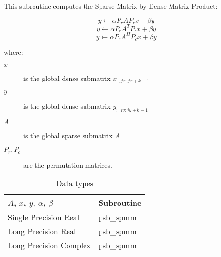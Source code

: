 %
%



This subroutine computes the Sparse Matrix by Dense Matrix Product:

\begin{equation}
y \leftarrow \alpha P_r A P_c x + \beta y
\label{eq:f90spmm_no_tra}
\end{equation}
\begin{equation}
y \leftarrow \alpha P_r A^T P_c x + \beta y
\label{eq:f90spmm_tra}
\end{equation}
\begin{equation}
y \leftarrow \alpha P_r A^H P_c x + \beta y
\label{eq:f90spmm_con}
\end{equation}

where:
\begin{description}
\item[$x$] is the global dense submatrix $x_{:, jx:jx+k-1}$
\item[$y$] is the global dense submatrix $y_{:, jy:jy+k-1}$
\item[$A$] is the global sparse submatrix $A$
\item[$P_r, P_c$] are the permutation matrices.
\end{description}

\begin{table}[h]
\begin{center}
\begin{tabular}{ll}
\hline
$A$, $x$, $y$, $\alpha$, $\beta$ & {\bf Subroutine}\\
\hline
Single Precision Real & psb\_spmm\\
Long Precision Real & psb\_spmm \\
Long Precision Complex & psb\_spmm \\
\hline
\end{tabular}
\end{center}
\caption{Data types\label{tab:f90spmm}}
\end{table}


